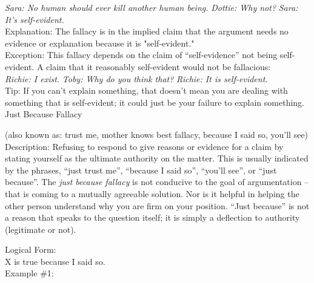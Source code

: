 \documentclass[a4paper,12pt,single,pdftex]{scrbook}
\begin{document}
    
      {\em Sara: No human should ever kill another human being.} \newline
{\em Dottie: Why not?} \newline
{\em Sara: It's self-evident.}
    \\

    
      Explanation: The fallacy is in the implied claim that the argument needs no evidence or explanation because it is "self-evident."
    \\

    
      Exception: This fallacy depends on the claim of “self-evidence” not being self-evident. A claim that it reasonably self-evident would not be fallacious:
    \\

    
      {\em Richie: I exist.} \newline
{\em Toby: Why do you think that?} \newline
{\em Richie: It is self-evident.}
    \\

    
      Tip: If you can't explain something, that doesn't mean you are dealing with something that is self-evident; it could just be your failure to explain something.
    \\

  

Just Because Fallacy
    
      (also known as: trust me, mother knows best fallacy, because I said so, you’ll see)
    \\

  
    Description: Refusing to respond to give reasons or evidence for a claim by stating yourself as the ultimate authority on the matter.  This is usually indicated by the phrases, “just trust me”, “because I said so”, “you’ll see”, or “just because”.  The {\it just because fallacy}  is not conducive to the goal of argumentation -- that is coming to a mutually agreeable solution.  Nor is it helpful in helping the other person understand why you are firm on your position. “Just because” is not a reason that speaks to the question itself; it is simply a deflection to authority (legitimate or not).

    
      Logical Form:
    \\

    
      X is true because I said so.
    \\

    
      Example \#1:
    \\
\end{document}
